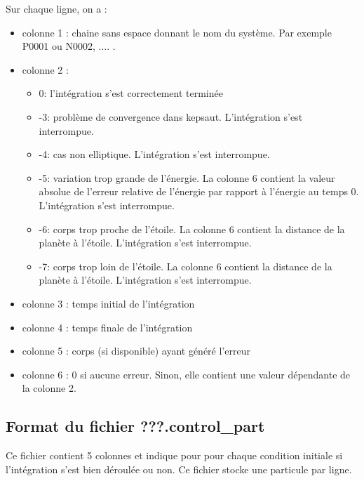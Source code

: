 \documentclass[11pt]{article}
\begin{document}
Sur chaque ligne, on a :
\begin{itemize}
\item colonne 1 : chaine sans espace donnant le nom du syst\`eme. Par exemple P0001 ou N0002, .... .
\item colonne 2 : 
\begin{itemize}
\item 0: l'int\'egration s'est correctement termin\'ee
\item -3: probl\`eme de convergence dans kepsaut. L'int\'egration s'est interrompue.
\item -4: cas non elliptique.  L'int\'egration s'est interrompue.
\item -5: variation trop grande de l'énergie.  La colonne 6 contient la valeur absolue de l'erreur relative de l'énergie par rapport \`a l'énergie au temps 0. L'int\'egration s'est interrompue.
\item -6: corps trop proche de l'\'etoile.  La colonne 6 contient la distance de la plan\`ete \`a l'\'etoile. L'int\'egration s'est interrompue.
\item -7: corps trop loin de l'\'etoile.  La colonne 6 contient la distance de la plan\`ete \`a l'\'etoile. L'int\'egration s'est interrompue.
\end{itemize}
\item colonne 3 : temps initial de l'int\'egration
\item colonne 4 : temps finale de l'int\'egration
\item colonne 5 : corps (si disponible) ayant g\'en\'er\'e l'erreur
\item colonne 6 : 0 si aucune erreur. Sinon, elle contient une valeur d\'ependante de la colonne 2.
\end{itemize}

\subsection{Format du fichier {\bf ???.control\_part} }

Ce fichier contient 5 colonnes et indique pour pour chaque condition initiale si l'int\'egration s'est bien d\'eroul\'ee ou non.
Ce fichier stocke une particule par ligne.
\end{document}
